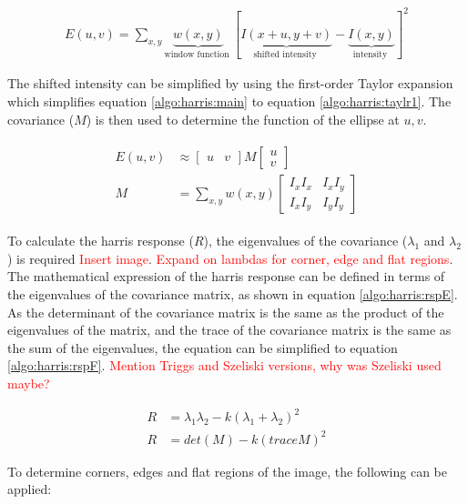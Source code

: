 \documentclass{article}
\newcommand{\rf}[1]{\textcolor{red}{#1}}
\begin{document}
\begin{align}
    E(u, v)=\sum_{x, y} \underbrace{w(x, y)}_{\text {window function }}[\underbrace{I(x+u, y+v)}_{\text {shifted intensity }}-\underbrace{I(x, y)}_{\text {intensity }}]^{2} \label{algo:harris:main}
\end{align}

The shifted intensity can be simplified by using the first-order Taylor expansion which simplifies equation \ref{algo:harris:main} to equation \ref{algo:harris:taylr1}.  The covariance ($M$) is then used to determine the function of the ellipse at $u,v$.  

\begin{align}
    \begin{split} \label{algo:harris:taylr1}
         E(u, v) &\approx\left[\begin{array}{ll}u & v\end{array}\right] M\left[\begin{array}{l}u\\v\end{array}\right]\\
        M&=\sum_{x, y} w(x, y)\left[\begin{array}{ll}I_{x} I_{x} & I_{x} I_{y} \\I_{x} I_{y} & I_{y} I_{y}\end{array}\right]
    \end{split}
\end{align}

To calculate the harris response ($R$), the eigenvalues of the covariance ($\lambda_1$ and $\lambda_2$) is required \rf{Insert image}.  \rf{Expand on lambdas for corner, edge and flat regions}.  The mathematical expression of the harris response can be defined in terms of the eigenvalues of the covariance matrix, as shown in equation \ref{algo:harris:rspE}.  As the determinant of the covariance matrix is the same as the product of the eigenvalues of the matrix, and the trace of the covariance matrix is the same as the sum of the eigenvalues, the equation can be simplified to equation \ref{algo:harris:rspF}.  \rf{Mention Triggs and Szeliski versions, why was Szeliski used maybe?}

\begin{align}
    R &= \lambda_1\lambda_2 - k (\lambda_1 + \lambda_2)^2 \label{algo:harris:rspE}\\
    R &= det(M) - k(traceM)^2 \label{algo:harris:rspF}
\end{align}

To determine corners, edges and flat regions of the image, the following can be applied:
\end{document}
